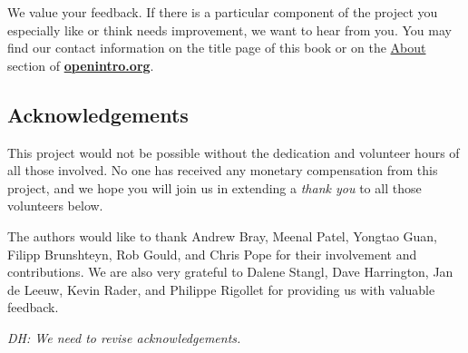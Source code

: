 
We value your feedback. If there is a particular component of the project you especially like or think needs improvement, we want to hear from you. You may find our contact information on the title page of this book or on the \href{http://www.openintro.org/about.php}{About} section of \href{http://www.openintro.org}{\color{black}\textbf{openintro.org}}.

\subsection*{Acknowledgements}

This project would not be possible without the dedication and volunteer hours of all those involved. No one has received any monetary compensation from this project, and we hope you will join us in extending a \emph{thank you} to all those volunteers below.

The authors would like to thank Andrew Bray, Meenal Patel, Yongtao Guan, Filipp Brunshteyn, Rob Gould, and Chris Pope for their involvement and contributions. %
We are also very grateful to Dalene Stangl, Dave Harrington, Jan de Leeuw, Kevin Rader, and Philippe Rigollet for providing us with valuable feedback.

\textit{DH: We need to revise acknowledgements.}



\begin{comment}

@article{smith1998fifty,
  title={Fifty years of randomised controlled trials},
  author={Smith, R},
  journal={British Medical Journal},
  volume={317},
  pages={1166},
  year={1998}
}

\end{comment}

